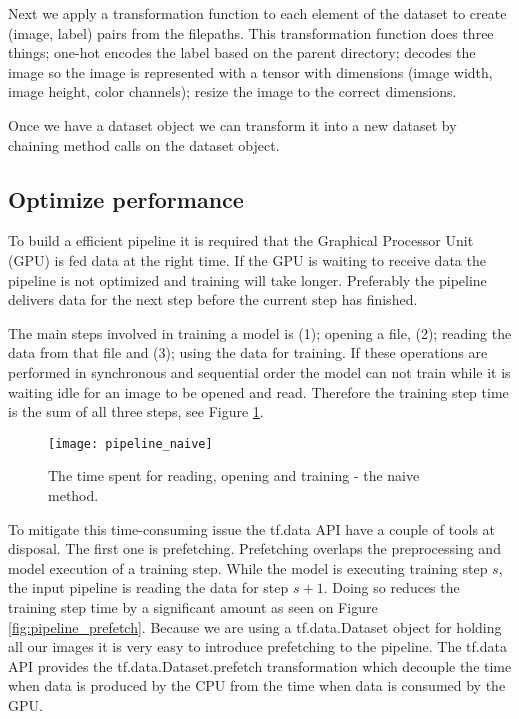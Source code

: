\documentclass[thesis.tex]{subfiles}
\begin{document}
Next we apply a transformation function to each element of the dataset to create (image, label) pairs from the filepaths. This transformation function does three things; one-hot encodes the label based on the parent directory; decodes the image so the image is represented with a tensor with dimensions (image width, image height, color channels); resize the image to the correct dimensions. 

Once we have a dataset object we can transform it into a new dataset by chaining method calls on the dataset object.



\subsection{Optimize performance}
To build a efficient pipeline it is required that the Graphical Processor Unit (GPU) is fed data at the right time. If the GPU is waiting to receive data the pipeline is not optimized and training will take longer. Preferably the pipeline delivers data for the next step before the current step has finished. 

The main steps involved in training a model is (1); opening a file, (2); reading the data from that file and (3); using the data for training. If these operations are performed in synchronous and sequential order the model can not train while it is waiting idle for an image to be opened and read. Therefore the training step time is the sum of all three steps, see Figure \ref{fig:pipeline_naive}. 

\begin{figure} %
  \begin{center}
    \texttt{[image: pipeline\_naive]}
    \caption[Naive pipeline.]{The time spent for reading, opening and training - the naive method.}
    \label{fig:pipeline_naive}
  \end{center}
\end{figure}

To mitigate this time-consuming issue the tf.data API have a couple of tools at disposal. The first one is prefetching. 
Prefetching overlaps the preprocessing and model execution of a training step. While the model is executing training step $s$, the input pipeline is reading the data for step $s+1$. Doing so reduces the training step time by a significant amount as seen on Figure \ref{fig:pipeline_prefetch}.
Because we are using a tf.data.Dataset object for holding all our images it is very easy to introduce prefetching to the pipeline. The tf.data API provides the tf.data.Dataset.prefetch transformation which decouple the time when data is produced by the CPU from the time when data is consumed by the GPU. 
\end{document}
